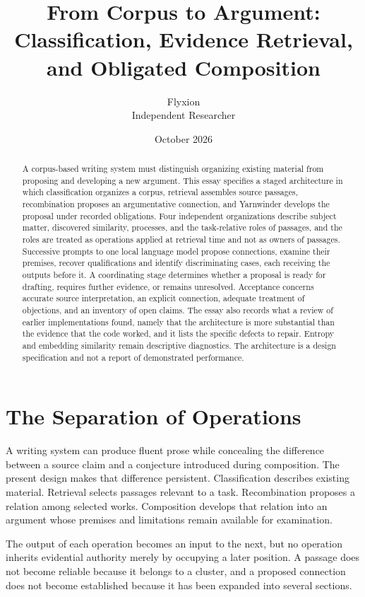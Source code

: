 \documentclass[11pt]{article}
\title{From Corpus to Argument:\\[0.3em]
\large Classification, Evidence Retrieval, and Obligated Composition}
\author{Flyxion\\Independent Researcher}
\date{October 2026}
\begin{document}
\maketitle

\begin{abstract}
\noindent A corpus-based writing system must distinguish organizing existing material from proposing and developing a new argument. This essay specifies a staged architecture in which classification organizes a corpus, retrieval assembles source passages, recombination proposes an argumentative connection, and Yarnwinder develops the proposal under recorded obligations. Four independent organizations describe subject matter, discovered similarity, processes, and the task-relative roles of passages, and the roles are treated as operations applied at retrieval time and not as owners of passages. Successive prompts to one local language model propose connections, examine their premises, recover qualifications and identify discriminating cases, each receiving the outputs before it. A coordinating stage determines whether a proposal is ready for drafting, requires further evidence, or remains unresolved. Acceptance concerns accurate source interpretation, an explicit connection, adequate treatment of objections, and an inventory of open claims. The essay also records what a review of earlier implementations found, namely that the architecture is more substantial than the evidence that the code worked, and it lists the specific defects to repair. Entropy and embedding similarity remain descriptive diagnostics. The architecture is a design specification and not a report of demonstrated performance.
\end{abstract}

\section{The Separation of Operations}

A writing system can produce fluent prose while concealing the difference between a source claim and a conjecture introduced during composition. The present design makes that difference persistent. Classification describes existing material. Retrieval selects passages relevant to a task. Recombination proposes a relation among selected works. Composition develops that relation into an argument whose premises and limitations remain available for examination.

The output of each operation becomes an input to the next, but no operation inherits evidential authority merely by occupying a later position. A passage does not become reliable because it belongs to a cluster, and a proposed connection does not become established because it has been expanded into several sections.
\end{document}
